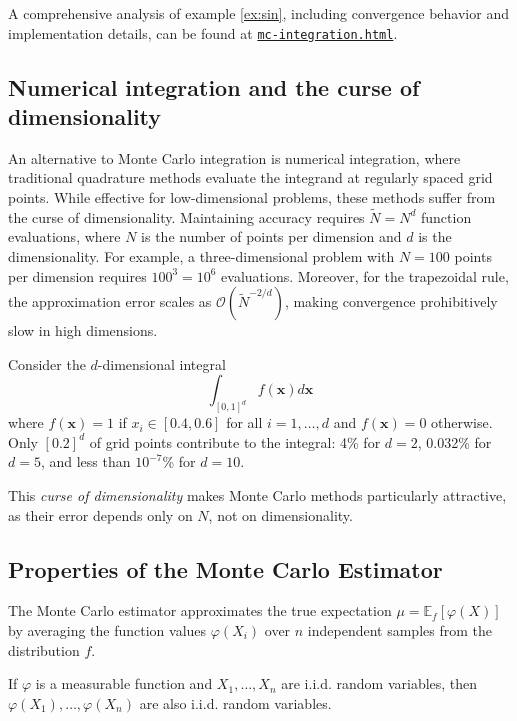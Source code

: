 A comprehensive analysis of example \ref{ex:sin}, including convergence behavior and implementation details, can be found at \href{https://nikogerman.github.io/Seminar/Notebooks/mc-integration.html}{\texttt{mc-integration.html}}.

\subsection{Numerical integration and the curse of dimensionality}
An alternative to Monte Carlo integration is numerical integration, where traditional quadrature methods evaluate the integrand at regularly spaced grid points. While effective for low-dimensional problems, these methods suffer from the curse of dimensionality.
Maintaining accuracy requires $\tilde{N} = N^d$ function evaluations, where $N$ is the number of points per dimension and $d$ is the dimensionality. For example, a three-dimensional problem with $N=100$ points per dimension requires $100^3 = 10^6$ evaluations. Moreover, for the trapezoidal rule, the approximation error scales as $\mathcal{O}(\tilde{N}^{-2/d})$, making convergence prohibitively slow in high dimensions.
\begin{example}
\label{ex-cod}
Consider the $d$-dimensional integral
$$
\int_{[0,1]^d} f(\mathbf{x}) d\mathbf{x}
$$
where $f(\mathbf{x}) = 1$ if $x_i\in [0.4,0.6]$ for all $i=1,\dots,d$ and $f(\mathbf{x}) = 0$ otherwise.
Only $[0.2]^d$ of grid points contribute to the integral: 4\% for $d=2$, 0.032\% for $d = 5$, and less than $10^{-7}$\% for $d = 10$.
\end{example}
This \textit{curse of dimensionality} makes Monte Carlo methods particularly attractive, as their error depends only on $N$, not on dimensionality.

\subsection{Properties of the Monte Carlo Estimator}
The Monte Carlo estimator approximates the true expectation $\mu = \mathbb{E}_f[\varphi(X)]$ by averaging the function values $\varphi(X_i)$ over $n$ independent samples from the distribution $f$.

\begin{lemma}
\label{lemma-measurable-composition}
If $\varphi$ is a measurable function and $X_1, \ldots, X_n$ are i.i.d. random variables, then $\varphi(X_1), \ldots, \varphi(X_n)$ are also i.i.d. random variables.
\end{lemma}

